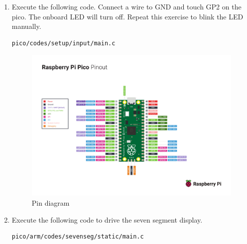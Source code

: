 \begin{enumerate}[label=\arabic*.,ref=\theenumi]
\item  Execute the following code.  Connect a wire to GND and touch GP2 on the pico.  The onboard LED will turn off.
Repeat this exercise to blink the LED manually.
\begin{lstlisting}
pico/codes/setup/input/main.c
\end{lstlisting}


\begin{figure}[!ht]
\centering
\includegraphics[width = \textwidth]{pico/arm/setup/figs/pin_sheet.pdf}
\caption{Pin diagram}
\label{fig:pin_sheet}
\end{figure}
\item Execute the following code to drive the seven segment display.
\begin{lstlisting}
pico/arm/codes/sevenseg/static/main.c
\end{lstlisting}
\end{enumerate}



